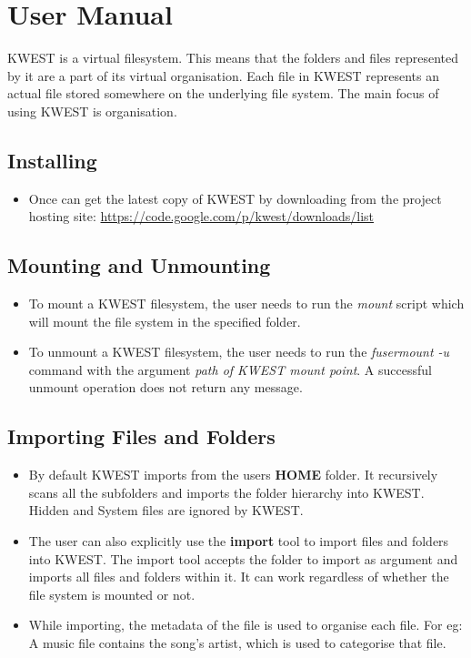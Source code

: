 \chapter{User Manual}

KWEST is a virtual filesystem. This means that the folders and files represented by it are a part of its virtual organisation. Each file in KWEST represents an actual file stored somewhere on the underlying file system. The main focus of using KWEST is organisation.

\section{Installing}
\begin{itemize}
\item Once can get the latest copy of KWEST by downloading from the project hosting site: \url{https://code.google.com/p/kwest/downloads/list}
\end{itemize}

\section{Mounting and Unmounting}

\begin{itemize}
\item To mount a KWEST filesystem, the user needs to run the \textit{mount} script which will mount the file system in the specified folder. 
\item To unmount a KWEST filesystem, the user needs to run the \textit{fusermount -u} command with the argument \textit{path of KWEST mount point}. A successful unmount operation does not return any message.
\end{itemize}

\section{Importing Files and Folders}

\begin{itemize}
\item By default KWEST imports from the users \textbf{HOME} folder. It recursively scans all the subfolders and imports the folder hierarchy into KWEST. Hidden and System files are ignored by KWEST.

\item The user can also explicitly use the \textbf{import} tool to import files and folders into KWEST. The import tool accepts the folder to import as argument and imports all files and folders within it. It can work regardless of whether the file system is mounted or not.

\item While importing, the metadata of the file is used to organise each file. For eg: A music file contains the song's artist, which is used to categorise that file.
\end{itemize}


